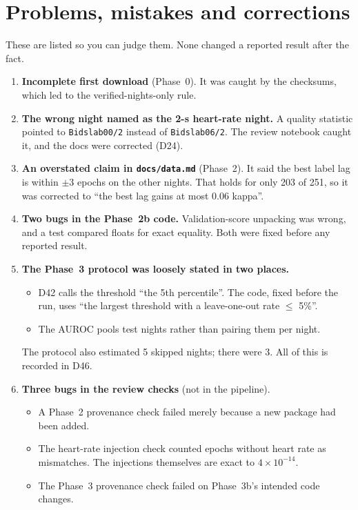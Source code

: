\documentclass[11pt,a4paper]{article}
\newcommand{\night}[2]{\texttt{Bidslab#1/#2}}
\newcommand{\code}[1]{\texttt{#1}}
\newcommand{\D}[1]{D#1}
\begin{document}
\section{Problems, mistakes and corrections}
\label{sec:problems}

These are listed so you can judge them. None changed a reported result after the fact.

\begin{enumerate}
\item \textbf{Incomplete first download} (Phase~0). It was caught by the checksums, which led to
the verified-nights-only rule.
\item \textbf{The wrong night named as the 2-s heart-rate night.} A quality statistic pointed to
\night{00}{2} instead of \night{06}{2}. The review notebook caught it, and the docs were
corrected (\D{24}).
\item \textbf{An overstated claim in \code{docs/data.md}} (Phase~2). It said the best label lag
is within $\pm 3$ epochs on the other nights. That holds for only 203 of 251, so it was
corrected to ``the best lag gains at most 0.06 kappa''.
\item \textbf{Two bugs in the Phase~2b code.} Validation-score unpacking was wrong, and a test
compared floats for exact equality. Both were fixed before any reported result.
\item \textbf{The Phase~3 protocol was loosely stated in two places.}
  \begin{itemize}
  \item \D{42} calls the threshold ``the 5th percentile''. The code, fixed before the run, uses
  ``the largest threshold with a leave-one-out rate $\le$ 5\%''.
  \item The AUROC pools test nights rather than pairing them per night.
  \end{itemize}
  The protocol also estimated 5 skipped nights; there were 3. All of this is recorded in
  \D{46}.
\item \textbf{Three bugs in the review checks} (not in the pipeline).
  \begin{itemize}
  \item A Phase~2 provenance check failed merely because a new package had been added.
  \item The heart-rate injection check counted epochs without heart rate as mismatches. The
  injections themselves are exact to $4\times10^{-14}$.
  \item The Phase~3 provenance check failed on Phase~3b's intended code changes.

\end{itemize}
\end{enumerate}
\end{document}
